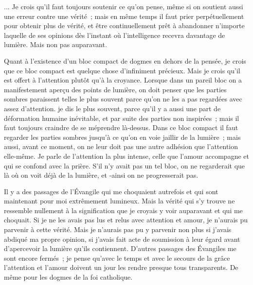 \documentclass[french,twoside]{book} %
\begin{document}
\begin{center}
\end{center}
\noindent ... Je crois qu'il faut toujours soutenir ce qu'on pense, même si on soutient aussi une erreur contre une vérité ; mais en même temps il faut prier perpétuellement pour obtenir plus de vérité, et être continuellement prêt à abandonner n'importe laquelle de ses opinions dès l'instant où l'intelligence recevra davantage de lumière. Mais non pas auparavant.\par
Quant à l'existence d'un bloc compact de dogmes en dehors de la pensée, je crois que ce bloc compact est quelque chose d'infiniment précieux. Mais je crois qu'il est offert à l'attention plutôt qu'à la croyance. Lorsque dans un pareil bloc on a manifestement aperçu des points de lumière, on doit penser que les parties sombres paraissent telles le plus souvent parce qu'on ne les a pas regardées avec assez d'attention. je dis le plus souvent, parce qu'il y a aussi une part de déformation humaine inévitable, et par suite des parties non inspirées ; mais il faut toujours craindre de se méprendre là-dessus. Dans ce bloc compact il faut regarder les parties sombres jusqu'à ce qu'on en voie jaillir de la lumière ; mais aussi, avant ce moment, on ne leur doit pas une autre adhésion que l'attention elle-même. Je parle de l'attention la plus intense, celle que l'amour accompagne et qui se confond avec la prière. S'il n'y avait pas un tel bloc, on ne regarderait que là où on voit déjà de la lumière, et -ainsi on ne progresserait pas.\par
Il y a des passages de l'Évangile qui me choquaient autrefois et qui sont maintenant pour moi extrêmement lumineux. Mais la vérité qui s'y trouve ne ressemble nullement à la signification que je croyais y voir auparavant et qui me choquait. Si je ne les avais pas lus et relus avec attention et amour, je n'aurais pu parvenir à cette vérité. Mais je n'aurais pas pu y parvenir non plus si j'avais abdiqué ma propre opinion, si j'avais fait acte de soumission à leur égard avant d'apercevoir la lumière qu'ils contiennent. D'autres passages des Évangiles me sont encore fermés ; je pense qu'avec le temps et avec le secours de la grâce l'attention et l'amour doivent un jour les rendre presque tous transparents. De même pour les dogmes de la foi catholique.\par
\end{document}
